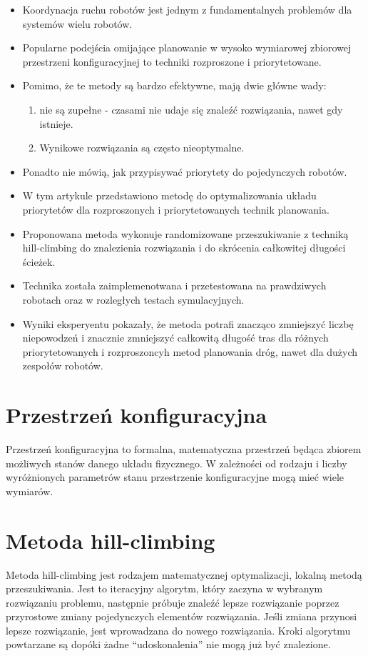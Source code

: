 \begin{itemize}
	\item Koordynacja ruchu robotów jest jednym z fundamentalnych problemów dla systemów wielu robotów.
	\item Popularne podejścia omijające planowanie w wysoko wymiarowej zbiorowej przestrzeni konfiguracyjnej to techniki rozproszone i priorytetowane.
	\item Pomimo, że te metody są bardzo efektywne, mają dwie główne wady:
	\begin{enumerate}
		\item nie są zupełne - czasami nie udaje się znaleźć rozwiązania, nawet gdy istnieje.
		\item Wynikowe rozwiązania są często nieoptymalne.
	\end{enumerate}
	\item Ponadto nie mówią, jak przypisywać priorytety do pojedynczych robotów.
	\item W tym artykule przedstawiono metodę do optymalizowania układu priorytetów dla rozproszonych i priorytetowanych technik planowania.
	\item Proponowana metoda wykonuje randomizowane przeszukiwanie z techniką hill-climbing do znalezienia rozwiązania i do skrócenia całkowitej długości ścieżek.
	\item Technika została zaimplemenotwana i przetestowana na prawdziwych robotach oraz w rozległych testach symulacyjnych.
	\item Wyniki eksperyentu pokazały, że metoda potrafi znacząco zmniejszyć liczbę niepowodzeń i znacznie zmniejszyć całkowitą długość tras dla różnych priorytetowanych i rozproszoncyh metod planowania dróg, nawet dla dużych zespołów robotów.
\end{itemize}

\section{Przestrzeń konfiguracyjna}
Przestrzeń konfiguracyjna to formalna, matematyczna przestrzeń będąca zbiorem możliwych stanów danego układu fizycznego.
W zależności od rodzaju i liczby wyróżnionych parametrów stanu przestrzenie konfiguracyjne mogą mieć wiele wymiarów.

\section{Metoda hill-climbing}
Metoda hill-climbing jest rodzajem matematycznej optymalizacji, lokalną metodą przeszukiwania.
Jest to iteracyjny algorytm, który zaczyna w wybranym rozwiązaniu problemu, następnie próbuje znaleźć lepsze rozwiązanie poprzez przyrostowe zmiany pojedynczych elementów rozwiązania.
Jeśli zmiana przynosi lepsze rozwiązanie, jest wprowadzana do nowego rozwiązania.
Kroki algorytmu powtarzane są dopóki żadne ``udoskonalenia'' nie mogą już być znalezione.

